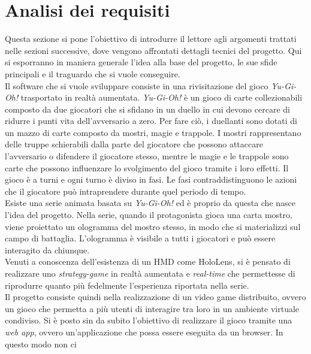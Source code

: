 \section{Analisi dei requisiti}\label{sec:Analisi}
    Questa sezione si pone l'obiettivo di introdurre il lettore agli argomenti trattati nelle sezioni successive, dove vengono affrontati dettagli tecnici del progetto. Qui si esporranno
    in maniera generale l'idea alla base del progetto, le sue sfide principali e il traguardo che si vuole conseguire.\\
    \newline
    Il software che si vuole sviluppare consiste in una rivisitazione del gioco \textit{Yu-Gi-Oh!} trasportato in realtà aumentata. \textit{Yu-Gi-Oh!} è un gioco di 
    carte collezionabili composto da due giocatori che si sfidano in un duello in cui devono cercare di ridurre i punti vita dell'avversario a zero. Per fare ciò, i duellanti sono dotati di un
    mazzo di carte composto da mostri, magie e trappole. I mostri rappresentano delle truppe schierabili dalla parte del giocatore che possono attaccare l'avversario o difendere il
    giocatore stesso, mentre le magie e le trappole sono carte che possono influenzare lo svolgimento del gioco tramite i loro effetti. Il gioco è a turni e ogni turno è diviso in fasi. Le 
    fasi contraddistinguono le azioni che il giocatore può intraprendere durante quel periodo di tempo.\\
    \newline
    Esiste una serie animata basata su \textit{Yu-Gi-Oh!} ed è proprio da questa che nasce l'idea del progetto. Nella serie, quando il protagonista gioca una carta mostro, 
    viene proiettato un ologramma del mostro stesso, in modo che si materializzi sul campo di battaglia. L'ologramma è visibile a tutti i giocatori e può essere interagito da chiunque.\\
    Venuti a conoscenza dell'esistenza di un HMD come HoloLens, si è pensato di realizzare uno \textit{strategy-game} in realtà aumentata e \textit{real-time} che permettesse di riprodurre 
    quanto più fedelmente l'esperienza riportata nella serie.\\
    \newline
    Il progetto consiste quindi nella realizzazione di un video game distribuito, ovvero un gioco che permetta a più utenti di interagire tra loro in un ambiente virtuale condiviso. 
    Si è posto sin da subito l'obiettivo di realizzare il gioco tramite una \textit{web app}, ovvero un'applicazione che possa essere eseguita da un browser. In questo modo non ci 
